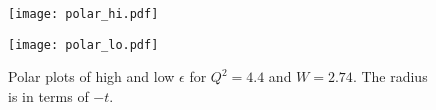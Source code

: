 \begin{figure}
  \centering
  \begin{minipage}[b]{0.48\linewidth}
    \texttt{[image: polar\_hi.pdf]}
  \end{minipage}
  \hfill
  \begin{minipage}[b]{0.48\linewidth}
    \texttt{[image: polar\_lo.pdf]}
  \end{minipage}
  
  \caption{Polar plots of high and low $\epsilon$ for $Q^2=4.4$ and $W=2.74$. The radius is in terms of $-t$.}
  \label{fig:7-1_polar}
\end{figure}

